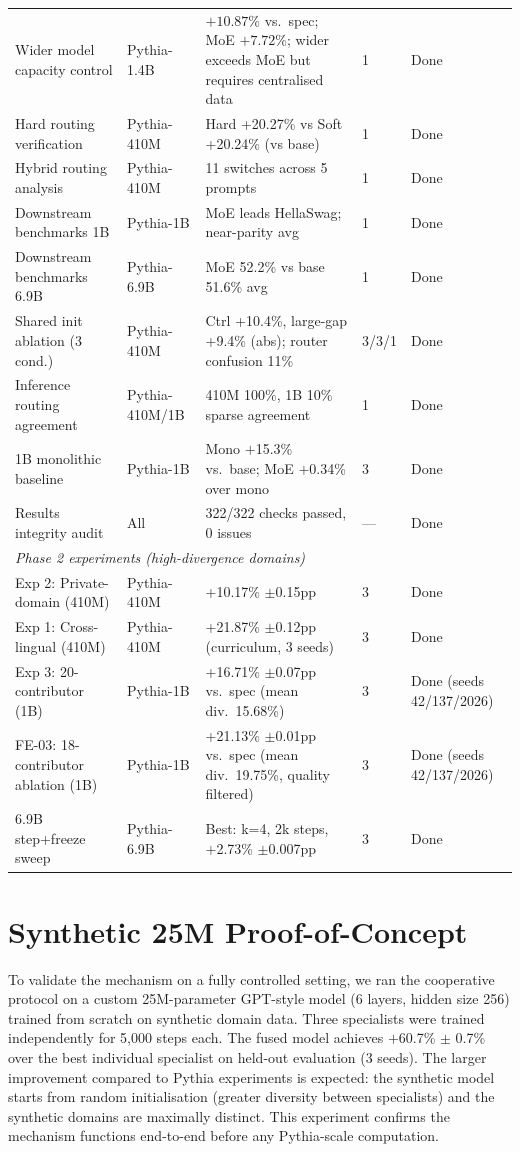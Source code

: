 \documentclass{article}
\begin{document}
\begin{table}[h]
{\begin{tabular}{p{5.0cm}p{2.8cm}p{5.5cm}p{1.8cm}p{3.5cm}}
Wider model capacity control & Pythia-1.4B & $+10.87\%$ vs.\ spec; MoE $+7.72\%$; wider exceeds MoE but requires centralised data & 1 & Done \\
Hard routing verification & Pythia-410M & Hard +20.27\% vs Soft +20.24\% (vs base) & 1 & Done \\
Hybrid routing analysis & Pythia-410M & 11 switches across 5 prompts & 1 & Done \\
Downstream benchmarks 1B & Pythia-1B & MoE leads HellaSwag; near-parity avg & 1 & Done \\
Downstream benchmarks 6.9B & Pythia-6.9B & MoE 52.2\% vs base 51.6\% avg & 1 & Done \\
Shared init ablation (3 cond.) & Pythia-410M & Ctrl +10.4\%, large-gap +9.4\% (abs); router confusion 11\% & 3/3/1 & Done \\
Inference routing agreement & Pythia-410M/1B & 410M 100\%, 1B 10\% sparse agreement & 1 & Done \\
1B monolithic baseline & Pythia-1B & Mono $+$15.3\% vs.\ base; MoE $+$0.34\% over mono & 3 & Done \\
Results integrity audit & All & 322/322 checks passed, 0 issues & --- & Done \\
\midrule
\multicolumn{5}{l}{\textit{Phase 2 experiments (high-divergence domains)}} \\
\midrule
Exp 2: Private-domain (410M) & Pythia-410M & +10.17\% $\pm$0.15pp & 3 & Done \\
Exp 1: Cross-lingual (410M) & Pythia-410M & +21.87\% $\pm$0.12pp (curriculum, 3 seeds) & 3 & Done \\
Exp 3: 20-contributor (1B) & Pythia-1B & +16.71\% $\pm$0.07pp vs.\ spec (mean div.\ 15.68\%) & 3 & Done (seeds 42/137/2026) \\
FE-03: 18-contributor ablation (1B) & Pythia-1B & +21.13\% $\pm$0.01pp vs.\ spec (mean div.\ 19.75\%, quality filtered) & 3 & Done (seeds 42/137/2026) \\
6.9B step+freeze sweep & Pythia-6.9B & Best: k=4, 2k steps, +2.73\% $\pm$0.007pp & 3 & Done \\
\bottomrule
\end{tabular}%
}
\end{table}

\section{Synthetic 25M Proof-of-Concept}
\label{app:synthetic}

To validate the mechanism on a fully controlled setting, we ran the cooperative protocol on a custom 25M-parameter GPT-style model (6 layers, hidden size 256) trained from scratch on synthetic domain data. Three specialists were trained independently for 5,000 steps each. The fused model achieves $+$60.7\% $\pm$ 0.7\% over the best individual specialist on held-out evaluation (3 seeds). The larger improvement compared to Pythia experiments is expected: the synthetic model starts from random initialisation (greater diversity between specialists) and the synthetic domains are maximally distinct. This experiment confirms the mechanism functions end-to-end before any Pythia-scale computation.
\end{document}
